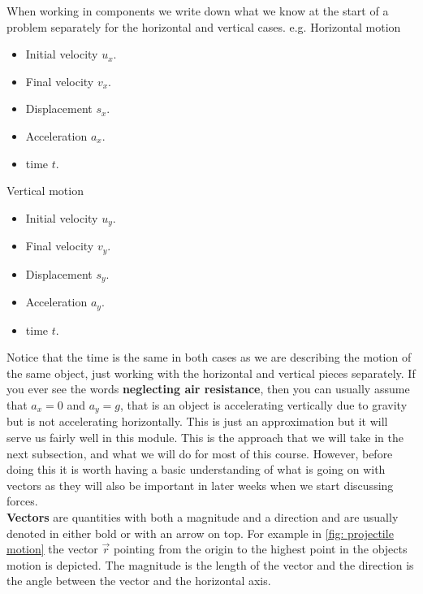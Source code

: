 When working in components we write down what we know at the start of a problem separately for the horizontal and vertical cases. e.g. Horizontal motion
    \begin{itemize}
    \setlength{\itemsep}{-5pt}
    \item Initial velocity $u_{x}$.
    \item Final velocity $v_{x}$.
    \item Displacement $s_{x}$.
    \item Acceleration $a_{x}$.
    \item time $t$.
\end{itemize}
Vertical motion
 \begin{itemize}
    \setlength{\itemsep}{-5pt}
    \item Initial velocity $u_{y}$.
    \item Final velocity $v_{y}$.
    \item Displacement $s_{y}$.
    \item Acceleration $a_{y}$.
    \item time $t$.
\end{itemize}
Notice that the time is the same in both cases as we are describing the motion of the same object, just working with the horizontal and vertical pieces separately. If you ever see the words \textbf{neglecting air resistance}, then you can usually assume that $a_{x}=0$ and $a_{y}=g$, that is an object is accelerating vertically due to gravity but is not accelerating horizontally. This is just an approximation but it will serve us fairly well in this module. This is the approach that we will take in the next subsection, and what we will do for most of this course. However, before doing this it is worth having a basic understanding of what is going on with vectors as they will also be important in later weeks when we start discussing forces.\\


\textbf{Vectors} are quantities with both a magnitude and a direction and are usually denoted in either bold or with an arrow on top. For example in \cref{fig: projectile motion} the vector $\vec{r}$ pointing from the origin to the highest point in the objects motion is depicted. The magnitude is the length of the vector and the direction is the angle between the vector and the horizontal axis.\\

